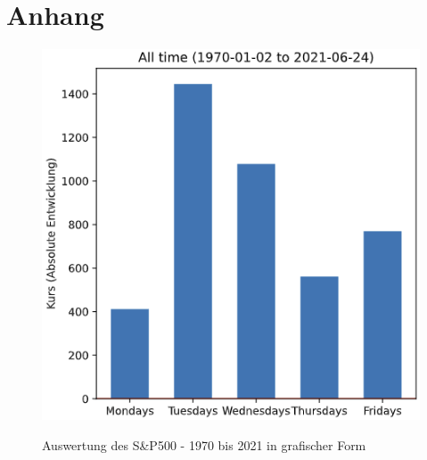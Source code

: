 \section*{Anhang}

\anhangsverzeichnis


\begin{figure}[hbt]
    \centering
    \begin{minipage}[t]{0.5\textwidth}
        \caption[]{Auswertung des S\&P500 - 1970 bis 2021 in grafischer Form}
        \includegraphics[width=1\textwidth]{img/Auswertung_SP500_1970-2021.PNG}\\
        \label{fig:auswertung_sp500_graph}
    \end{minipage}
\end{figure}

